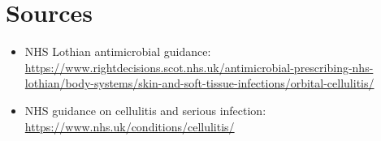 \section*{Sources}
\begin{itemize}
\item NHS Lothian antimicrobial guidance: \url{https://www.rightdecisions.scot.nhs.uk/antimicrobial-prescribing-nhs-lothian/body-systems/skin-and-soft-tissue-infections/orbital-cellulitis/}
\item NHS guidance on cellulitis and serious infection: \url{https://www.nhs.uk/conditions/cellulitis/}
\end{itemize}
